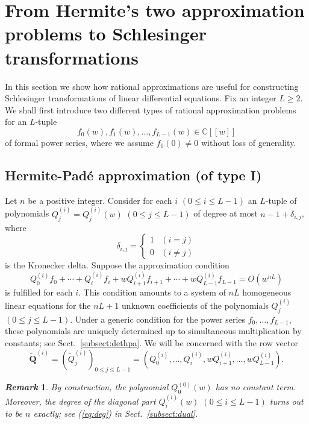 \documentclass[12pt]{article}
\newtheorem{remark}[thm]{\it Remark}
\numberwithin{equation}{section}
\begin{document}
\section{From Hermite's two approximation problems to Schlesinger transformations}
\label{sect:hpa}

In this section 
we show how rational approximations are
useful for constructing
Schlesinger transformations
of linear differential equations.
Fix an integer $L \geq 2$.
We shall first introduce 
two different types of rational approximation
problems for 
an $L$-tuple   
\[f_0(w), f_1(w), \ldots, f_{L-1}(w)  \in {\mathbb C}[\![w]\!]\]
of formal power series,
where we assume $f_0(0) \neq 0$ without loss of generality.






\subsection{Hermite-Pad\'e approximation (of type I)}
\label{subsect:hpa}


Let $n$ be a positive integer. 
Consider for each $i$ $(0 \leq i \leq L-1)$ an $L$-tuple of polynomials
$Q_j^{(i)}=Q_j^{(i)}(w)$ $(0 \leq j \leq L-1)$
of degree at most $n-1+\delta_{i,j}$,
where
\[
\delta_{i,j} =
\left\{ 
\begin{array}{ll}
1& (i = j)
\\
0 & (i \neq j)
\end{array}
\right.
\]
is the Kronecker delta.
Suppose
the approximation condition
\begin{equation} \label{eq:hpa}
 Q_0^{(i)} f_0+\cdots +Q_i^{(i)} f_i +w Q_{i+1}^{(i)} f_{i+1}  + \cdots + w Q_{L-1}^{(i)}f_{L-1} = O(w^{nL})
 \end{equation}
 is  fulfilled for each $i$.
This condition
amounts to
 a system of  $n L$  homogeneous linear equations
for the $n L+1$
unknown coefficients of the polynomials $Q_j^{(i)}$ $(0 \leq j \leq L-1)$.
Under a generic condition for the power series
$f_0, \ldots,f_{L-1}$,
these polynomials  are uniquely determined up to simultaneous multiplication by constants;
see Sect.~\ref{subsect:dethpa}.
We will be concerned with the row vector
\[\widetilde{\boldsymbol Q}^{(i)}
=\left( \widetilde{Q}^{(i)}_j \right)_{0 \leq j \leq L-1}
 =\left( Q_0^{(i)}, \ldots ,Q_i^{(i)}, w Q_{i+1}^{(i)},  \ldots ,w Q_{L-1}^{(i)} \right).
\]



\begin{remark} \rm
By construction,
the polynomial
$Q^{(0)}_0(w)$ 
has no constant term.
Moreover,
the degree of the {\it diagonal} part  $Q^{(i)}_i(w)$ $(0 \leq i \leq L-1)$
 turns out to be $n$ exactly;
see (\ref{eq:deg}) in Sect.~\ref{subsect:dual}.
\end{remark}
\end{document}
